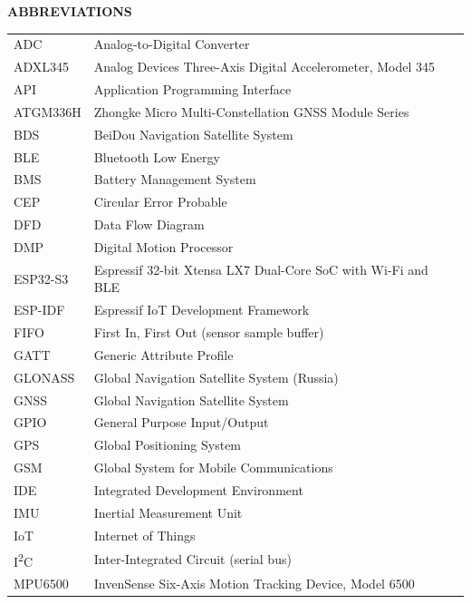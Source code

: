 \documentclass[12pt,a4paper,oneside]{report}
\begin{document}
\begin{center}{\large\bfseries ABBREVIATIONS\par}\end{center}
\vspace{1.6em}
\begin{singlespace}
\noindent
\begin{tabular}{@{}p{1.15in}@{}p{4.0in}@{}}
ADC       & Analog-to-Digital Converter\\
ADXL345   & Analog Devices Three-Axis Digital Accelerometer, Model 345\\
API       & Application Programming Interface\\
ATGM336H  & Zhongke Micro Multi-Constellation GNSS Module Series\\
BDS       & BeiDou Navigation Satellite System\\
BLE       & Bluetooth Low Energy\\
BMS       & Battery Management System\\
CEP       & Circular Error Probable\\
DFD       & Data Flow Diagram\\
DMP       & Digital Motion Processor\\
ESP32-S3  & Espressif 32-bit Xtensa LX7 Dual-Core SoC with Wi-Fi and BLE\\
ESP-IDF   & Espressif IoT Development Framework\\
FIFO      & First In, First Out (sensor sample buffer)\\
GATT      & Generic Attribute Profile\\
GLONASS   & Global Navigation Satellite System (Russia)\\
GNSS      & Global Navigation Satellite System\\
GPIO      & General Purpose Input/Output\\
GPS       & Global Positioning System\\
GSM       & Global System for Mobile Communications\\
IDE       & Integrated Development Environment\\
IMU       & Inertial Measurement Unit\\
IoT       & Internet of Things\\
I\textsuperscript{2}C & Inter-Integrated Circuit (serial bus)\\
MPU6500   & InvenSense Six-Axis Motion Tracking Device, Model 6500\\

\end{tabular}
\end{singlespace}
\end{document}
